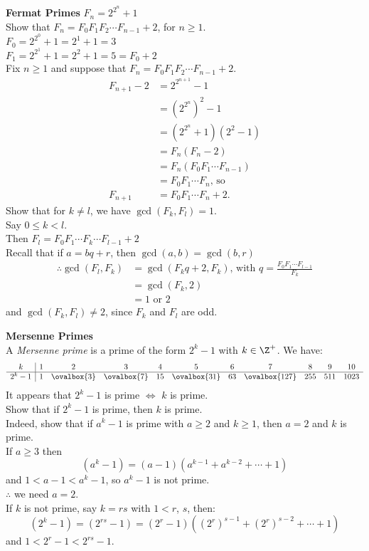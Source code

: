 \textbf{Fermat Primes} $F_n=2^{2^n}+1$ \\
\eg Show that $F_n=F_0F_1F_2\dotsm F_{n-1}+2$, for $n\geq1$. \\
\soln $F_0=2^{2^0}+1=2^1+1=3$ \\
$F_1=2^{2^1}+1=2^2+1=5=F_0+2$ \\
Fix $n\geq1$ and suppose that $F_n=F_0F_1F_2\dotsm F_{n-1}+2$.
\begin{align*}
F_{n+1}-2 &= 2^{2^{n+1}}-1 \\
&= (2^{2^n})^2-1 \\
&= (2^{2^n}+1)(2^2-1) \\
&= F_n(F_n-2) \\
&= F_n(F_0F_1\dotsm F_{n-1}) \\
&= F_0F_1\dotsm F_n \text{, so} \\
F_{n+1} &= F_0 F_1 \dotsm F_n + 2 .
\end{align*}
\eg Show that for $k\neq l$, we have $\gcd(F_k,F_l)=1$. \\
\pf Say $0\leq k< l$. \\
Then $F_l=F_0F_1\dotsm F_k\dotsm F_{l-1}+2$ \\
Recall that if $a=bq+r$, then $\gcd(a,b)=\gcd(b,r)$
\begin{align*}
\therefore \gcd(F_l,F_k) &= \gcd(F_{k}q+2,F_k)\text{, with }q=\frac{F_0F_1\dotsm F_{l-1}}{F_k} \\
&= \gcd(F_k,2) \\
&= 1 \text{ or } 2
\end{align*}
and $\gcd(F_k,F_l)\neq2$, since $F_k$ and $F_l$ are odd.

\textbf{Mersenne Primes} \\
 A \emph{Mersenne prime} is a prime of the form $2^k-1$ with $k\in\Z^+$.  We have:
\[ \begin{array}{c|cccccccccc}
k & 1 & 2 & 3 & 4 & 5 & 6 & 7 & 8 & 9 & 10 \\ \hline
2^k-1 & 1 & \ovalbox{3} & \ovalbox{7} & 15 & \ovalbox{31} & 63 & \ovalbox{127} & 255 & 511 & 1023
\end{array} \]
It appears that $2^k-1$ is prime $\iff$ $k$ is prime. \\
\eg Show that if $2^k-1$ is prime, then $k$ is prime. \\
Indeed, show that if $a^k-1$ is prime with $a\geq2$ and $k\geq1$, then $a=2$ and $k$ is prime. \\
\soln If $a\geq3$ then
\[ (a^k-1) = (a-1)(a^{k-1}+a^{k-2}+\dotsb+1) \]
and $1<a-1<a^k-1$, so $a^k-1$ is not prime. \\
$\therefore$ we need $a=2$. \\
If $k$ is not prime, say $k=rs$ with $1<r$, $s$, then:
\[ (2^k-1) = (2^{rs}-1) = (2^r-1)((2^r)^{s-1}+(2^r)^{s-2}+\dotsb+1) \]
and $1<2^r-1<2^{rs}-1$.

